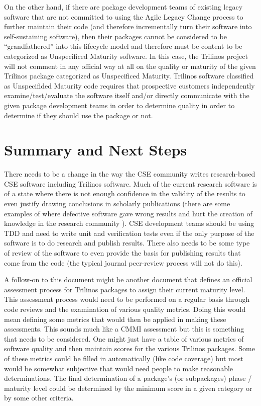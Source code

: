 \documentclass[11pt]{SANDreport}
\begin{document}
On the other hand, if there are package development teams of existing
legacy software that are not committed to using the Agile Legacy
Change process to further maintain their code (and therefore
incrementally turn their software into self-sustaining software), then
their packages cannot be considered to be ``grandfathered'' into this
lifecycle model and therefore must be content to be categorized as
Unspecificed Maturity software.  In this case, the Trilinos project
will not comment in any official way at all on the quality or maturity
of the given Trilinos package categorized as Unspecificed Maturity.
Trilinos software classified as Unspecifided Maturity code requires
that prospective customers independently examine/test/evaluate the
software itself and/or directly communicate with the given package
development teams in order to determine quality in order to determine
if they should use the package or not.


%
{}\section{Summary and Next Steps}
\label{sec:summary_next_steps}
%

There needs to be a change in the way the CSE community writes
research-based CSE software including Trilinos software.  Much of the
current research software is of a state where there is not enough
confidence in the validity of the results to even justify drawing
conclusions in scholarly publications (there are some examples of
where defective software gave wrong results and hurt the creation of
knowledge in the research community
{}\cite{ScientistsNightmareFiveRetractions2006}).  CSE development
teams should be using TDD and need to write unit and verification
tests even if the only purpose of the software is to do research and
publish results.  There also needs to be some type of review of the
software to even provide the basis for publishing results that come
from the code (the typical journal peer-review process will not do
this).

A follow-on to this document might be another document that defines an
official assessment process for Trilinos packages to assign their
current maturity level.  This assessment process would need to be
performed on a regular basis through code reviews and the examination
of various quality metrics.  Doing this would mean defining some
metrics that would then be applied in making these assessments. This
sounds much like a CMMI assessment but this is something that needs to
be considered.  One might just have a table of various metrics of
software quality and then maintain scores for the various Trilinos
packages.  Some of these metrics could be filled in automatically
(like code coverage) but most would be somewhat subjective that would
need people to make reasonable determinations.  The final
determination of a package's (or subpackages) phase / maturity level
could be determined by the minimum score in a given category or by
some other criteria.
\end{document}
